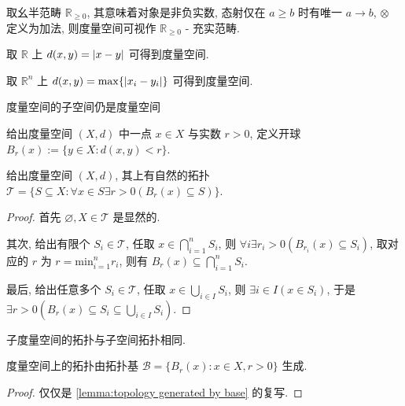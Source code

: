 \begin{definition}
    取幺半范畴 \(\mathbb{R}_{\geq 0}\), 其意味着对象是非负实数, 态射仅在 \(a \geq b\) 时有唯一 \(a \to b\), \(\otimes\) 定义为加法,
    则度量空间可视作 \(\mathbb{R}_{\geq 0}\) - 充实范畴.
\end{definition}

\begin{example}
    取 \(\mathbb{R}\) 上 \(d(x,y) = \abs{x - y}\) 可得到度量空间.
\end{example}

\begin{example}
    取 \(\mathbb{R}^n\) 上 \(d(x,y) = \max \{\abs{x_i - y_i}\}\) 可得到度量空间.
\end{example}

\begin{example}
    度量空间的子空间仍是度量空间
\end{example}

\begin{definition}[开球]
    给出度量空间 \((X,d)\) 中一点 \(x \in X\) 与实数 \(r > 0\), 定义开球 \(B_r (x) := \{y \in X : d(x,y) < r\}\).
\end{definition}

\begin{definition}
    给出度量空间 \((X,d)\), 其上有自然的拓扑 \(\mathcal{T} = \{S \subseteq X : \forall x \in S \exists r > 0 (B_r(x) \subseteq S)\}\).

    \begin{proof}
        首先 \(\varnothing, X \in \mathcal{T}\) 是显然的.

        其次, 给出有限个 \(S_i \in \mathcal{T}\), 任取 \(x \in \bigcap_{i=1}^n S_i\), 则 \(\forall i \exists r_i > 0 (B_{r_i} (x) \subseteq S_i)\),
        取对应的 \(r\) 为 \(r = \mathrm{min}_{i=1}^n r_i\), 则有 \(B_r (x) \subseteq \bigcap_{i=1}^n S_i\).

        最后, 给出任意多个 \(S_i \in \mathcal{T}\), 任取 \(x \in \bigcup_{i \in I} S_i\), 则 \(\exists i \in I (x \in S_i)\),
        于是 \(\exists r > 0 (B_r (x) \subseteq S_i \subseteq \bigcup_{i \in I} S_i)\).
    \end{proof}
\end{definition}

\begin{corollary}
    子度量空间的拓扑与子空间拓扑相同.
\end{corollary}

\begin{lemma}
    度量空间上的拓扑由拓扑基 \(\mathcal{B} = \{B_r (x) : x \in X, r > 0\}\) 生成.

    \begin{proof}
        仅仅是 \ref{lemma:topology generated by base} 的复写.
    \end{proof}
\end{lemma}


